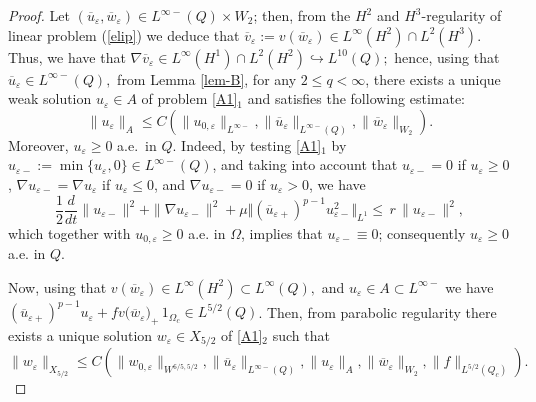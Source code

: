 \documentclass[11pt,reqno]{amsart}%
\numberwithin{equation}{section}
\begin{document}
{\begin{proof}
Let $(\overline{u}_\varepsilon,\overline{w}_\varepsilon)\in L^{\infty-}(Q)\times W_2$; 
then, from the $H^2$ and $H^3$-regularity of linear problem 
(\ref{elip})
we deduce that $\overline{v}_\varepsilon:=v(\overline{w}_\varepsilon) \in L^\infty(H^2)\cap L^2(H^3)$. 
Thus, we have that $\nabla \overline{v}_\varepsilon\in L^\infty(H^1)\cap L^2(H^2)\hookrightarrow L^{10}(Q);$
hence, using that $\overline{u}_\varepsilon\in L^{\infty-}(Q),$ from Lemma \ref{lem-B}, for any $2\le q<\infty$, there exists
a unique weak solution $u_\varepsilon\in A$ of problem \eqref{A1}$_1$ and satisfies  the following estimate:
\begin{equation}\label{A-1-1}
\|u_\varepsilon\|_{A}\le C\left(\|u_{0,\varepsilon}\|_{L^{\infty-}},\|\overline{u}_\varepsilon\|_{L^{\infty-}(Q)},\|\overline{w}_\varepsilon\|_{W_2}\right).
\end{equation}
Moreover, $u_\varepsilon\ge 0$ a.e.\ in $Q$. Indeed, by testing \eqref{A1}$_1$ by $u_{\varepsilon-}:=\min\{u_\varepsilon,0\}\in  L^{\infty-}(Q)$, 
and taking into account that $u_{\varepsilon-}=0$ if $u_\varepsilon\ge0$, $\nabla u_{\varepsilon-}=\nabla u_\varepsilon$ if $u_\varepsilon\le 0$, and $\nabla u_{\varepsilon-}=0$ if $u_\varepsilon>0$, we have
$$
\frac12\frac{d}{dt}\|u_{\varepsilon-}\|^2+\|\nabla u_{\varepsilon-}\|^2
+\mu\Vert (\overline u_{\varepsilon+})^{p-1}u^2_{\varepsilon-}\Vert_{L^1}
\le \, r\, \|u_{\varepsilon-}\|^2,
$$
which together with $u_{0,\varepsilon}\ge 0$ a.e. in $\Omega$, implies that $u_{\varepsilon-}\equiv0$; consequently $u_\varepsilon\ge0$ a.e. in $Q$.




Now, using that $v(\overline{w}_\varepsilon)\in L^\infty(H^2)\subset L^\infty(Q),$ and $u_\varepsilon\in A\subset L^{\infty-}$ we have $(\overline u_{\varepsilon +} )^{p-1}{u_{\varepsilon}}+f {v(\overline{w}_\varepsilon})_+\,1_{\Omega_c}\in L^{5/2}(Q)$. 
Then, from parabolic regularity there exists a unique solution $w_\varepsilon\in X_{5/2}$ of \eqref{A1}$_2$ such that
\begin{equation}\label{A-2}
\|w_\varepsilon\|_{X_{5/2}}\le C\left(\|w_{0,\varepsilon}\|_{W^{6/5,5/2}},
\|\overline{u}_\varepsilon\|_{L^{\infty-}(Q)},
\|{u}_\varepsilon\|_{A},\|\overline{w}_\varepsilon\|_{W_2},\|f\|_{L^{5/2}(Q_c)}\right).
\end{equation}


\end{proof}}
\end{document}
